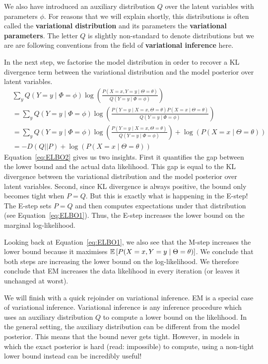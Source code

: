 We also have introduced
an auxiliary distribution $ Q $ over the latent variables with parameters $ \phi $. 
For reasons that we will explain shortly,
this distributions is often called the \textbf{variational distribution} and its parameters the
\textbf{variational parameters}. The letter $ Q $ is slightly non-standard to denote distributions but
we are are following conventions from the field of \textbf{variational inference} here.

In the next step, we factorise the model distribution in order to recover a KL divergence term between
the variational distribution and the model posterior over latent variables.
\begin{align}
&\sum_{y} Q(Y=y \mid \Phi=\phi) \log\left(\frac{P(X=x, Y=y \mid  \Theta = \theta)}{Q(Y=y \mid \Phi=\phi)}\right) \\
&= \sum_{y} Q(Y=y \mid \Phi=\phi) \log\left(\frac{P(Y=y \mid X=x, \Theta = \theta)P(X=x \mid \Theta = \theta)}{Q(Y=y \mid \Phi=\phi)}\right) \\
&= \sum_{y} Q(Y=y \mid \Phi=\phi) \log\left(\frac{P(Y=y \mid X=x, \Theta = \theta)}{Q(Y=y \mid \Phi=\phi)}\right) + \log(P(X=x \mid \Theta=\theta)) \\
&= -D(Q||P) + \log(P(X=x \mid \Theta=\theta)) \label{eq:ELBO2}
\end{align}
Equation~\eqref{eq:ELBO2} gives us two insights. First it quantifies the gap between the lower bound
and the actual data likelihood. This gap is equal to the KL divergence between the variational distribution
and the model posterior over latent variables. Second, since KL divergence is always positive, the bound only becomes
tight when $ P=Q $. But this is exactly what is happening in the E-step! The E-step sets $ P=Q $ and
then computes expectations under that distribution (see Equation~\eqref{eq:ELBO1}). Thus, the E-step increases
the lower bound on the marginal log-likelihood.

Looking back at Equation~\eqref{eq:ELBO1}, we also see that the M-step increases the lower bound because 
it maximises $ \mathbb{E}\left[P(X=x, Y=y\mid \Theta = \theta)\right] $. We conclude that both steps
are increasing the lower bound on the log-likelihood. We therefore conclude that EM increases the data likelihood
in every iteration (or leaves it unchanged at worst).

We will finish with a quick rejoinder on variational inference. EM is a special case of variational inference.
Variational inference is any inference procedure which uses an auxiliary distribution $ Q $ to compute
a lower bound on the likelihood. In the general setting, the auxiliary distribution can be different from the 
model posterior. This means that the bound never gets tight. However, in models in which the exact posterior 
is hard (read: impossible) to compute, using a non-tight lower bound instead can be incredibly useful!

